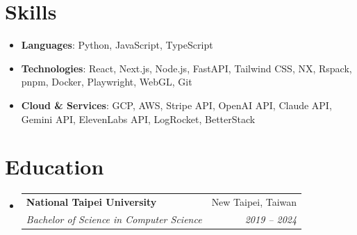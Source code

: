 \documentclass[letterpaper,11pt]{article}
\makeatletter
\newcommand{\resumeSubheading}[4]{
  \vspace{-1pt}\item
    \begin{tabular*}{0.97\textwidth}[t]{l@{\extracolsep{\fill}}r}
      \textbf{#1} & #2 \\
      \textit{\small#3} & \textit{\small #4} \\
    \end{tabular*}\vspace{-5pt}
}
\newcommand{\resumeSubHeadingListStart}{\begin{itemize}[leftmargin=*]}
\newcommand{\resumeSubHeadingListEnd}{\end{itemize}}
\makeatother
\begin{document}
%
\section{Skills}
 \resumeSubHeadingListStart
   \item{
     \textbf{Languages}{: Python, JavaScript, TypeScript}
   }
   \item{
     \textbf{Technologies}{: React, Next.js, Node.js, FastAPI, Tailwind CSS, NX, Rspack, pnpm, Docker, Playwright, WebGL, Git}
   }
   \item{
     \textbf{Cloud \& Services}{: GCP, AWS, Stripe API, OpenAI API, Claude API, Gemini API, ElevenLabs API, LogRocket, BetterStack}
   }
 \resumeSubHeadingListEnd

\section{Education}
\resumeSubHeadingListStart
  \resumeSubheading
    {National Taipei University}{New Taipei, Taiwan}
    {Bachelor of Science in Computer Science}{2019 -- 2024}
\resumeSubHeadingListEnd


\end{document}
